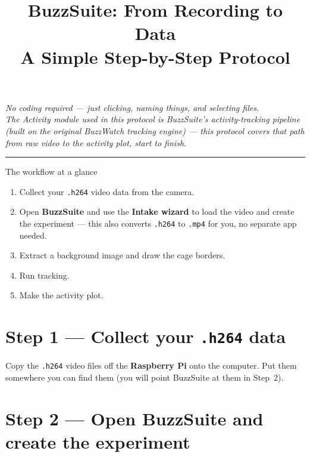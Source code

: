 \documentclass[11pt,a4paper]{article}
\title{\textbf{BuzzSuite: From Recording to Data}\\[4pt]
\large A Simple Step-by-Step Protocol}
\author{}
\date{}
\begin{document}
\maketitle

\vspace{-1.5em}
\begin{center}
\textit{No coding required --- just clicking, naming things, and selecting files.}\\[2pt]
\textit{\small The Activity module used in this protocol is BuzzSuite's activity-tracking
pipeline (built on the original BuzzWatch tracking engine) --- this protocol covers that
path from raw video to the activity plot, start to finish.}
\end{center}

\hrule
\vspace{1em}

\begin{tipbox}{The workflow at a glance}
\begin{enumerate}[leftmargin=*,itemsep=1pt]
  \item Collect your \texttt{.h264} video data from the camera.
  \item Open \textbf{BuzzSuite} and use the \textbf{Intake wizard} to load the video and create
        the experiment --- this also converts \texttt{.h264} to \texttt{.mp4} for you, no separate
        app needed.
  \item Extract a background image and draw the cage borders.
  \item Run tracking.
  \item Make the activity plot.
\end{enumerate}
\end{tipbox}

\section{Step 1 --- Collect your \texttt{.h264} data}

Copy the \texttt{.h264} video files off the \textbf{Raspberry Pi} onto the
computer. Put them somewhere you can find them (you will point BuzzSuite at
them in Step~2).

\section{Step 2 --- Open BuzzSuite and create the experiment}
\end{document}
